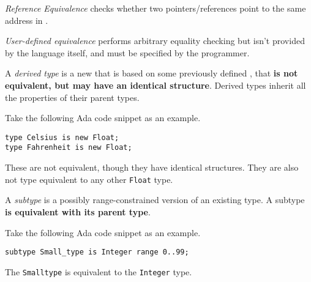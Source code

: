 \begin{definition}\label{def:Type_Equivalence-Reference}
  \emph{Reference Equivalence} checks whether two pointers/references point to the same address in .
\end{definition}

\begin{definition}\label{def:Type_Equivalence-User_Defined}
  \emph{User-defined equivalence} performs arbitrary equality checking but isn't provided by the language itself, and must be specified by the programmer.
\end{definition}

\begin{definition}\label{def:Derived_Type}
  A \emph{derived type} is a new  that is based on some previously defined , that \textbf{is not equivalent, but may have an identical structure}.
  Derived types inherit all the properties of their parent types.

  Take the following Ada code snippet as an example.
\begin{verbatim}
type Celsius is new Float;
type Fahrenheit is new Float;
\end{verbatim}
  These are not equivalent, though they have identical structures.
  They are also not type equivalent to any other \texttt{Float} type.
\end{definition}

\begin{definition}[Subtype]\label{def:Subtype}
  A \emph{subtype} is a possibly range-constrained version of an existing type.
  A subtype \textbf{is equivalent with its parent type}.

  Take the following Ada code snippet as an example.
\begin{verbatim}
subtype Small_type is Integer range 0..99;
\end{verbatim}
  The \texttt{Small\textunderscore{}type} is equivalent to the \texttt{Integer} type.
\end{definition}
